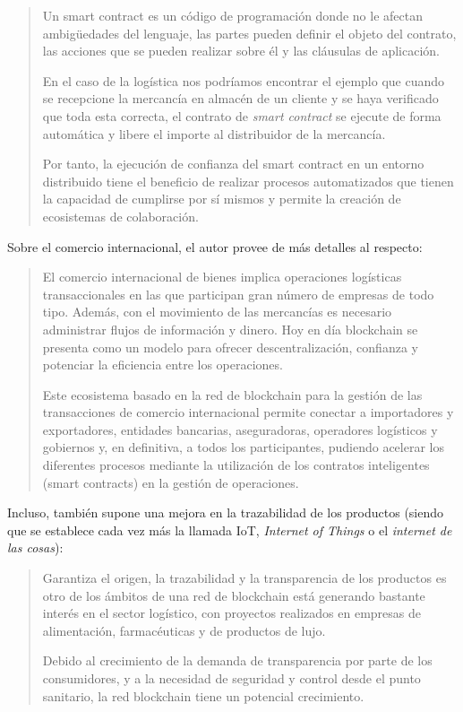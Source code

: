 \documentclass[12pt,a4paper,twoside]{book}
\begin{document}
\begin{quotation}
Un smart contract es un código de programación donde no le afectan ambigüedades del lenguaje, las partes pueden definir el objeto del contrato, las acciones que se pueden realizar sobre él y las cláusulas de aplicación.

En el caso de la logística nos podríamos encontrar el ejemplo que cuando se recepcione la mercancía en almacén de un cliente y se haya verificado que toda esta correcta, el contrato de \textit{smart contract} se ejecute de forma automática y libere el importe al distribuidor de la mercancía.

Por tanto, la ejecución de confianza del smart contract en un entorno distribuido tiene el beneficio de realizar procesos automatizados que tienen la capacidad de cumplirse por sí mismos y permite la creación de ecosistemas de colaboración. \cite{smartcontract:logistica}
\end{quotation}

Sobre el comercio internacional, el autor provee de más detalles al respecto:

\begin{quotation}
El comercio internacional de bienes implica operaciones logísticas transaccionales en las que participan gran número de empresas de todo tipo. Además, con el movimiento de las mercancías es necesario administrar flujos de información y dinero. Hoy en día blockchain se presenta como un modelo para ofrecer descentralización, confianza y potenciar la eficiencia entre los operaciones.

Este ecosistema basado en la red de blockchain para la gestión de las transacciones de comercio internacional permite conectar a importadores y exportadores, entidades bancarias, aseguradoras, operadores logísticos y gobiernos y, en definitiva, a todos los participantes, pudiendo acelerar los diferentes procesos mediante la utilización de los contratos inteligentes (smart contracts) en la gestión de operaciones. \cite{smartcontract:logistica}
\end{quotation}

Incluso, también supone una mejora en la trazabilidad de los productos (siendo que se establece cada vez más la llamada IoT, \textit{Internet of Things} o el \textit{internet de las cosas}):

\begin{quotation}
Garantiza el origen, la trazabilidad y la transparencia de los productos es otro de los ámbitos de una red de blockchain está generando bastante interés en el sector logístico, con proyectos realizados en empresas de alimentación, farmacéuticas y de productos de lujo.

Debido al crecimiento de la demanda de transparencia por parte de los consumidores, y a la necesidad de seguridad y control desde el punto sanitario, la red blockchain tiene un potencial crecimiento. \cite{smartcontract:logistica}
\end{quotation}
\end{document}

